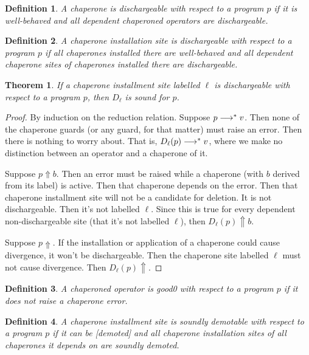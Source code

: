 \documentclass{sigplanconf}
\newtheorem{definition}{Definition}
\newtheorem{theorem}{Theorem}
\begin{document}
\begin{definition}
A chaperone is \emph{dischargeable} with respect to a program $p$ if it is well-behaved and all dependent chaperoned operators are dischargeable.
\end{definition}

\begin{definition}
A chaperone installation site is \emph{dischargeable} with respect to a program $p$ if all chaperones installed there are well-behaved and all dependent chaperone sites of chaperones installed there are dischargeable.
\end{definition}

\begin{theorem}
If a chaperone installment site labelled $\ell$ is dischargeable with respect to a program $p$, then $D_\ell$ is sound for $p$.
\end{theorem}

\begin{proof}
By induction on the reduction relation.
Suppose $p\longrightarrow^{*} v$.
Then none of the chaperone guards (or any guard, for that matter) must raise an error.
Then there is nothing to worry about.
That is, $D_\ell(p)\longrightarrow^{*} v$, where we make no distinction between an operator and a chaperone of it.

Suppose $p\Uparrow b$. 
Then an error must be raised while a chaperone (with $b$ derived from its label) is active.
Then that chaperone depends on the error.
Then that chaperone installment site will not be a candidate for deletion.
It is not dischargeable.
Then it's not labelled $\ell$.
Since this is true for every dependent non-dischargeable site (that it's not labelled $\ell$), then $D_\ell(p)\Uparrow b$.

Suppose $p\Uparrow$.
If the installation or application of a chaperone could cause divergence, it won't be dischargeable.
Then the chaperone site labelled $\ell$ must not cause divergence.
Then $D_\ell(p)\Uparrow$.
\end{proof}

\begin{definition}
A chaperoned operator is \emph{good0} with respect to a program $p$ if it does not raise a chaperone error.
\end{definition}

\begin{definition}
A chaperone installment site is soundly \emph{demotable} with respect to a program $p$ if it can be [demoted] and all chaperone installation sites of all chaperones it depends on are soundly demoted.
\end{definition}
\end{document}
